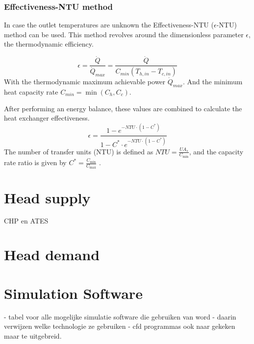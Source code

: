 \subsubsection{Effectiveness-NTU method}
In case the outlet temperatures are unknown the Effectiveness-NTU ($\epsilon$-NTU) method can be used. This method revolves around the dimensionless parameter $\epsilon$, the thermodynamic efficiency. 

\begin{equation}\label{eq::epsilon}
    \epsilon = \frac{\dot{Q}}{\dot{Q}_{max}} = \frac{\dot{Q}}{{C}_{min}(T_{h,in} - T_{c,in})}
\end{equation}
With the thermodynamic maximum achievable power $\dot{Q}_{max}$. And the minimum heat capacity rate $C_{min} = \min(C_h, C_c)$.

After performing an energy balance, these values are combined to calculate the heat exchanger effectiveness.
\begin{equation}
    \epsilon = \frac{1 - e^{-NTU \cdot (1 - C^*)}}{1 - C^* \cdot e^{-NTU \cdot (1 - C^*)}}
\end{equation}
The number of transfer units (NTU) is defined as \( NTU = \frac{U A_s}{C_{\min}} \), and the capacity rate ratio is given by \( C^{*} = \frac{C_{\min}}{C_{\max}} \) \cite{cengel2025heat}.

\section{Head supply}
CHP en ATES

\section{Head demand}


\section{Simulation Software}
- tabel voor alle mogelijke simulatie software die gebruiken van word
- daarin verwijzen welke technologie ze gebruiken
- cfd programmas ook naar gekeken maar te uitgebreid. 

